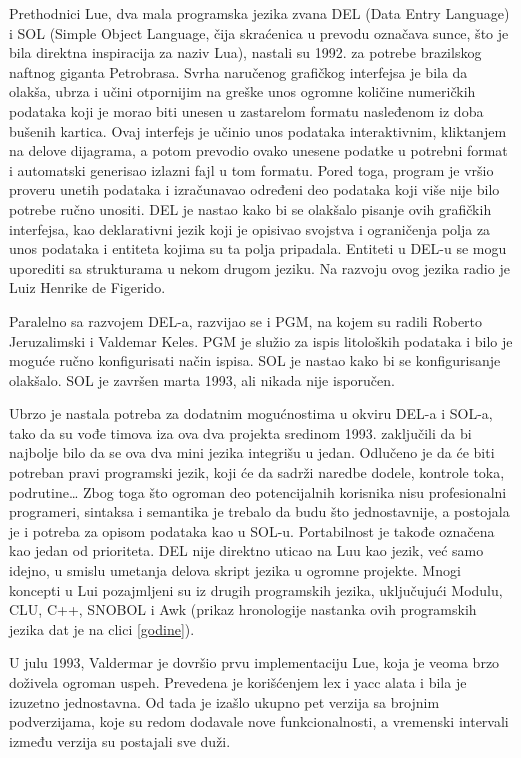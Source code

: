 \documentclass[a4paper]{article}
\begin{document}
Prethodnici Lue, dva mala programska jezika zvana DEL (Data Entry Language) i SOL (Simple Object Language, čija skraćenica u prevodu označava sunce, što je bila direktna inspiracija za naziv Lua), nastali su 1992. za potrebe brazilskog naftnog giganta Petrobrasa. Svrha naručenog grafičkog interfejsa je bila da olakša, ubrza i učini otpornijim na greške unos ogromne količine numeričkih podataka koji je morao biti unesen u zastarelom formatu nasleđenom iz doba bušenih kartica. Ovaj interfejs je učinio unos podataka interaktivnim, kliktanjem na delove dijagrama, a potom prevodio ovako unesene podatke u potrebni format i automatski generisao izlazni fajl u tom formatu. Pored toga, program je vršio proveru unetih podataka i izračunavao određeni deo podataka koji više nije bilo potrebe ručno unositi. DEL je nastao kako bi se olakšalo pisanje ovih grafičkih interfejsa, kao deklarativni jezik koji je opisivao svojstva i ograničenja polja za unos podataka i entiteta kojima su ta polja pripadala. Entiteti u DEL-u se mogu uporediti sa strukturama u nekom drugom jeziku. Na razvoju ovog jezika radio je Luiz Henrike de Figerido.

Paralelno sa razvojem DEL-a, razvijao se i PGM, na kojem su radili Roberto Jeruzalimski i Valdemar Keles. PGM je služio za ispis litoloških podataka i bilo je moguće ručno konfigurisati način ispisa. SOL je nastao kako bi se konfigurisanje olakšalo. SOL je završen marta 1993, ali nikada nije isporučen.

Ubrzo je nastala potreba za dodatnim mogućnostima u okviru DEL-a i SOL-a, tako da su vođe timova iza ova dva projekta sredinom 1993. zaključili da bi najbolje bilo da se ova dva mini jezika integrišu u jedan. Odlučeno je da će biti potreban pravi programski jezik, koji će da sadrži naredbe dodele, kontrole toka, podrutine… Zbog toga što ogroman deo potencijalnih korisnika nisu profesionalni programeri, sintaksa i semantika je trebalo da budu što jednostavnije, a postojala je i potreba za opisom podataka kao u SOL-u. Portabilnost je takođe označena kao jedan od prioriteta. DEL nije direktno uticao na Luu kao jezik, već samo idejno, u smislu umetanja delova skript jezika u ogromne projekte. Mnogi koncepti u Lui pozajmljeni su iz drugih programskih jezika, uključujući Modulu, CLU, C++, SNOBOL i Awk (prikaz hronologije nastanka ovih programskih jezika dat je na clici \ref{godine}). %

U julu 1993, Valdermar je dovršio prvu implementaciju Lue, koja je veoma brzo doživela ogroman uspeh. Prevedena je korišćenjem lex i yacc alata i bila je izuzetno jednostavna. Od tada je izašlo ukupno pet verzija sa brojnim podverzijama, koje su redom dodavale nove funkcionalnosti, a vremenski intervali između verzija su postajali sve duži. 
 
\end{document}
